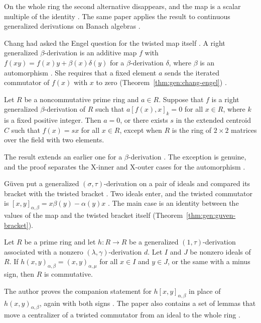 On the whole ring the second alternative disappears, and the map is a scalar
multiple of the identity \cite[Theorem~1.2, p.~2]{DharaAliDas2016}. The same
paper applies the result to continuous generalized derivations on Banach
algebras \cite[p.~2]{DharaAliDas2016}.

Chang had asked the Engel question for the twisted map itself
\cite[p.~1641]{Chang2008}. A right generalized $\beta$-derivation is an additive
map $f$ with $f(xy)=f(x)y+\beta(x)\delta(y)$ for a $\beta$-derivation $\delta$,
where $\beta$ is an automorphism \cite[p.~1641]{Chang2008}. She requires that a
fixed element $a$ sends the iterated commutator of $f(x)$ with $x$ to zero (Theorem~\ref{thm:gen:chang-engel})
\cite[p.~1641]{Chang2008}.\begin{theorem}\label{thm:gen:chang-engel}
Let $R$ be a noncommutative prime ring and $a\in R$. Suppose that $f$ is a right
generalized $\beta$-derivation of $R$ such that $a[f(x),x]_{k}=0$ for all $x\in R$,
where $k$ is a fixed positive integer. Then $a=0$, or there exists $s$ in the
extended centroid $C$ such that $f(x)=sx$ for all $x\in R$, except when $R$ is the
ring of $2\times2$ matrices over the field with two elements.
\end{theorem}

The result extends an earlier one for a $\beta$-derivation
\cite[p.~1641]{Chang2008}. The exception is genuine, and the proof separates
the X-inner and X-outer cases for the automorphism \cite[p.~1647]{Chang2008}.

G\"uven put a generalized $(\sigma,\tau)$-derivation on a pair of ideals and
compared its bracket with the twisted bracket
\cite[p.~1]{Guven2013}. Two ideals enter, and the twisted commutator is
$[x,y]_{\alpha,\beta}=x\beta(y)-\alpha(y)x$
\cite[p.~1]{Guven2013}. The main case is an identity between the values of the
map and the twisted bracket itself (Theorem~\ref{thm:gen:guven-bracket}).

\begin{theorem}\label{thm:gen:guven-bracket}
Let $R$ be a prime ring and let $h\colon R\to R$ be a generalized
$(1,\tau)$-derivation associated with a nonzero $(\lambda,\gamma)$-derivation $d$.
Let $I$ and $J$ be nonzero ideals of $R$. If $h(x,y)_{\alpha,\beta}=(x,y)_{\alpha,\mu}$
for all $x\in I$ and $y\in J$, or the same with a minus sign, then $R$ is
commutative.
\end{theorem}

The author proves the companion statement for $h[x,y]_{\alpha,\beta}$ in place
of $h(x,y)_{\alpha,\beta}$, again with both signs \cite[p.~1]{Guven2013}. The
paper also contains a set of lemmas that move a centralizer of a twisted
commutator from an ideal to the whole ring \cite[Theorem~1, p.~125]{Guven2013}.

